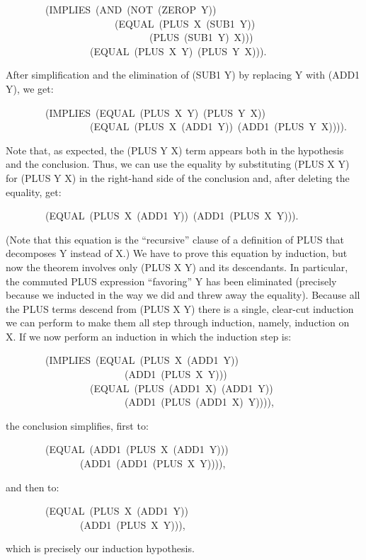 \documentclass[10pt]{book}
\newenvironment{pubasis}{\begin{flushleft}}{\end{flushleft}}
\begin{document}
\begin{pubasis}
~~~~~~~~(IMPLIES~(AND~(NOT~(ZEROP~Y))\\
~~~~~~~~~~~~~~~~~~~~~~(EQUAL~(PLUS~X~(SUB1~Y))\\
~~~~~~~~~~~~~~~~~~~~~~~~~~~~~(PLUS~(SUB1~Y)~X)))\\
~~~~~~~~~~~~~~~~~(EQUAL~(PLUS~X~Y)~(PLUS~Y~X))).\\
\end{pubasis}
After simplification and the elimination of (SUB1 Y) by replacing Y with
(ADD1 Y), we get:
\begin{pubasis}
~~~~~~~~(IMPLIES~(EQUAL~(PLUS~X~Y)~(PLUS~Y~X))\\
~~~~~~~~~~~~~~~~~(EQUAL~(PLUS~X~(ADD1~Y))~(ADD1~(PLUS~Y~X)))).\\
\end{pubasis}
Note that, as expected, the (PLUS Y X) term appears both in the hypothesis
and the conclusion.  Thus, we can use the equality by substituting
(PLUS X Y) for (PLUS Y X) in the right-hand side of the conclusion and,
after deleting the equality, get:
\begin{pubasis}
~~~~~~~~(EQUAL~(PLUS~X~(ADD1~Y))~(ADD1~(PLUS~X~Y))).\\
\end{pubasis}
(Note that this equation is the ``recursive'' clause
of a definition of PLUS that decomposes Y instead of X.)
We have to prove this equation by induction, but now the theorem  involves only
(PLUS X Y) and its descendants.  In particular, the commuted PLUS expression ``favoring'' Y
has been eliminated (precisely because we inducted in the way we did and threw
away the equality).
Because all the PLUS terms descend from (PLUS X Y) there is a single,
clear-cut induction we can perform to make them all step through
induction, namely, induction on X.  If we now
perform an induction in which the induction step is:
\begin{pubasis}
~~~~~~~~(IMPLIES~(EQUAL~(PLUS~X~(ADD1~Y))\\
~~~~~~~~~~~~~~~~~~~~~~~~(ADD1~(PLUS~X~Y)))\\
~~~~~~~~~~~~~~~~~(EQUAL~(PLUS~(ADD1~X)~(ADD1~Y))\\
~~~~~~~~~~~~~~~~~~~~~~~~(ADD1~(PLUS~(ADD1~X)~Y)))),\\
\end{pubasis}
the conclusion
simplifies, first to:
\begin{pubasis}
~~~~~~~~(EQUAL~(ADD1~(PLUS~X~(ADD1~Y)))\\
~~~~~~~~~~~~~~~(ADD1~(ADD1~(PLUS~X~Y)))),\\
\end{pubasis}
and then to:
\begin{pubasis}
~~~~~~~~(EQUAL~(PLUS~X~(ADD1~Y))\\
~~~~~~~~~~~~~~~(ADD1~(PLUS~X~Y))),\\
\end{pubasis}
which is precisely our induction hypothesis.
\end{document}
